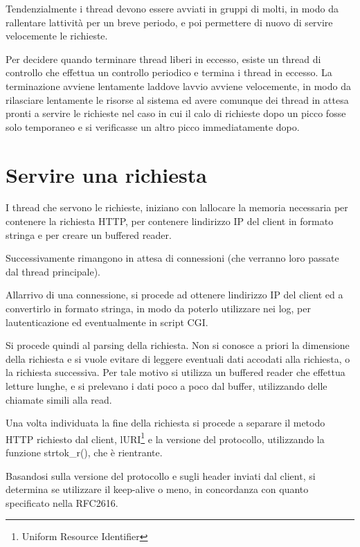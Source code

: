 \documentclass[a4paper,11pt]{article}
\begin{document}
\bigskip

{\sffamily
Tendenzialmente i thread devono essere avviati in gruppi di molti, in
modo da rallentare l{\textquotesingle}attivit\`a per un breve periodo,
e poi permettere di nuovo di servire velocemente le richieste.}

{\sffamily
Per decidere quando terminare thread liberi in eccesso, esiste un thread
di controllo che effettua un controllo periodico e termina i thread in
eccesso. La terminazione avviene lentamente laddove
l{\textquotesingle}avvio avviene velocemente, in modo da rilasciare
lentamente le risorse al sistema ed avere comunque dei thread in attesa
pronti a servire le richieste nel caso in cui il calo di richieste dopo
un picco fosse solo temporaneo e si verificasse un altro picco
immediatamente dopo.}


\bigskip

\section{Servire una richiesta}
{\sffamily
I thread che servono le richieste, iniziano con
l{\textquotesingle}allocare la memoria necessaria per contenere la
richiesta HTTP, per contenere l{\textquotesingle}indirizzo IP del
client in formato stringa e per creare un buffered reader.}

{\sffamily
Successivamente rimangono in attesa di connessioni (che verranno loro
passate dal thread principale).}

{\sffamily
All{\textquotesingle}arrivo di una connessione, si procede ad ottenere
l{\textquotesingle}indirizzo IP del client ed a convertirlo in formato
stringa, in modo da poterlo utilizzare nei log, per
l{\textquotesingle}autenticazione ed eventualmente in script CGI.}

{\sffamily
Si procede quindi al parsing della richiesta. Non si conosce a priori la
dimensione della richiesta e si vuole evitare di leggere eventuali dati
accodati alla richiesta, o la richiesta successiva. Per tale motivo si
utilizza un buffered reader che effettua letture lunghe, e si prelevano
i dati poco a poco dal buffer, utilizzando delle chiamate simili alla
read.}

{\sffamily
Una volta individuata la fine della richiesta si procede a separare il
metodo HTTP richiesto dal client,
l{\textquotesingle}URI\footnote{Uniform Resource Identifier} e la
versione del protocollo, utilizzando la funzione strtok\_r()\cite{LIBC01},
che \`e rientrante.}

{\sffamily
Basandosi sulla versione del protocollo e sugli header inviati dal
client, si determina se utilizzare il keep-alive o meno, in concordanza
con quanto specificato nella RFC2616\cite{STD01}.}
\end{document}
